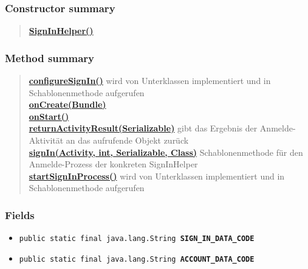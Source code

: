 \documentclass[11pt,a4paper]{report}
\begin{document}
{{{{{{{{{{\subsubsection{Constructor summary}{
\begin{verse}
\hyperlink{edu.kit.pse17.go_app.Login.SignInHelper()}{{\bf SignInHelper()}} \\
\end{verse}
}
\subsubsection{Method summary}{
\begin{verse}
\hyperlink{edu.kit.pse17.go_app.Login.SignInHelper.configureSignIn()}{{\bf configureSignIn()}} wird von Unterklassen implementiert und in Schablonenmethode aufgerufen\\
\hyperlink{edu.kit.pse17.go_app.Login.SignInHelper.onCreate(Bundle)}{{\bf onCreate(Bundle)}} \\
\hyperlink{edu.kit.pse17.go_app.Login.SignInHelper.onStart()}{{\bf onStart()}} \\
\hyperlink{edu.kit.pse17.go_app.Login.SignInHelper.returnActivityResult(java.io.Serializable)}{{\bf returnActivityResult(Serializable)}} gibt das Ergebnis der Anmelde-Aktivität an das aufrufende Objekt zurück\\
\hyperlink{edu.kit.pse17.go_app.Login.SignInHelper.signIn(Activity, int, java.io.Serializable, java.lang.Class)}{{\bf signIn(Activity, int, Serializable, Class)}} Schablonenmethode für den Anmelde-Prozess der konkreten SignInHelper\\
\hyperlink{edu.kit.pse17.go_app.Login.SignInHelper.startSignInProcess()}{{\bf startSignInProcess()}} wird von Unterklassen implementiert und in Schablonenmethode aufgerufen\\
\end{verse}
}
\subsubsection{Fields}{
\begin{itemize}
\item{
\label{edu.kit.pse17.go_app.Login.SignInHelper.SIGN_IN_DATA_CODE}\hypertarget{edu.kit.pse17.go_app.Login.SignInHelper.SIGN_IN_DATA_CODE}{\texttt{public static final java.lang.String\ {\bf  SIGN\_IN\_DATA\_CODE}}
}
}
\item{
\label{edu.kit.pse17.go_app.Login.SignInHelper.ACCOUNT_DATA_CODE}\hypertarget{edu.kit.pse17.go_app.Login.SignInHelper.ACCOUNT_DATA_CODE}{\texttt{public static final java.lang.String\ {\bf  ACCOUNT\_DATA\_CODE}}
}
}
\end{itemize}
}
}}}}}}}}}}
\end{document}
